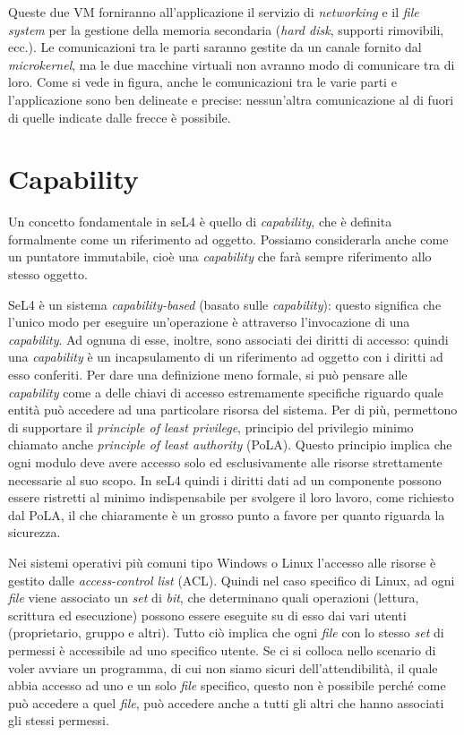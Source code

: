 Queste due VM forniranno all'applicazione il servizio di \textit{networking} e il \textit{file system} per la gestione della memoria secondaria (\textit{hard disk}, supporti rimovibili, ecc.). Le comunicazioni tra le parti saranno gestite da un canale fornito dal \textit{microkernel}, ma le due macchine virtuali non avranno modo di comunicare tra di loro. Come si vede in figura, anche le comunicazioni tra le varie parti e l'applicazione sono ben delineate e precise: nessun'altra comunicazione al di fuori di quelle indicate dalle frecce è possibile.

\section{Capability}
Un concetto fondamentale in seL4 è quello di \textit{capability}, che è definita formalmente come un riferimento ad oggetto. Possiamo considerarla anche come un puntatore immutabile, cioè una \textit{capability} che farà sempre riferimento allo stesso oggetto.

SeL4 è un sistema \textit{capability-based} (basato sulle \textit{capability}): questo significa che l'unico modo per eseguire un'operazione è attraverso l'invocazione di una \textit{capability}. Ad ognuna di esse, inoltre, sono associati dei diritti di accesso: quindi una \textit{capability} è un incapsulamento di un riferimento ad oggetto con i diritti ad esso conferiti.
Per dare una definizione meno formale, si può pensare alle \textit{capability} come a delle chiavi di accesso estremamente specifiche riguardo quale entità può accedere ad una particolare risorsa del sistema. Per di più, permettono di supportare il \textit{principle of least privilege}, principio del privilegio minimo chiamato anche \textit{principle of least authority} (PoLA). Questo principio implica che ogni modulo deve avere accesso solo ed esclusivamente alle risorse strettamente necessarie al suo scopo.
In seL4 quindi i diritti dati ad un componente possono essere ristretti al minimo indispensabile per svolgere il loro lavoro, come richiesto dal PoLA, il che chiaramente è un grosso punto a favore per quanto riguarda la sicurezza.

Nei sistemi operativi più comuni tipo Windows o Linux l'accesso alle risorse è gestito dalle \textit{access-control list} (ACL). Quindi nel caso specifico di Linux, ad ogni \textit{file} viene associato un \textit{set} di \textit{bit}, che determinano quali operazioni (lettura, scrittura ed esecuzione) possono essere eseguite su di esso dai vari utenti (proprietario, gruppo e altri). Tutto ciò implica che ogni \textit{file} con lo stesso \textit{set} di permessi è accessibile ad uno specifico utente. Se ci si colloca nello scenario di voler avviare un programma, di cui non siamo sicuri dell'attendibilità, il quale abbia accesso ad uno e un solo \textit{file} specifico, questo non è possibile perché come può accedere a quel \textit{file}, può accedere anche a tutti gli altri che hanno associati gli stessi permessi.

